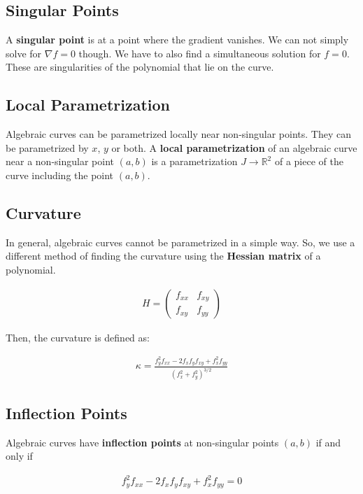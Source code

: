 \documentclass[11pt]{article}
\begin{document}
\subsection{Singular Points}
\label{sec:org06f9d47}
A \textbf{singular point} is at a point where the gradient vanishes. We can not simply solve for \(\nabla f = 0\) though. We have to also find a simultaneous solution for \(f = 0\). These are singularities of the polynomial that lie on the curve.
\subsection{Local Parametrization}
\label{sec:org8443ee6}
Algebraic curves can be parametrized locally near non-singular points. They can be parametrized by \(x\), \(y\) or both. A \textbf{local parametrization} of an algebraic curve near a non-singular point \(\left( a,b \right)\) is a parametrization \(J \rightarrow \mathbb{R}^{2}\) of a piece of the curve including the point \(\left( a,b \right)\).

\subsection{Curvature}
\label{sec:orgdcc2a2f}
In general, algebraic curves cannot be parametrized in a simple way. So, we use a different method of finding the curvature using the \textbf{Hessian matrix} of a polynomial.

\begin{align*}
    H = \begin{pmatrix} f_{xx} & f_{xy} \\ f_{xy} & f_{yy} \end{pmatrix}
\end{align*}

Then, the curvature is defined as:

\begin{align*}
    \kappa = \frac{f_{y}^{2}f_{xx}-2f_{x}f_{y}f_{xy}+f_{x}^{2}f_{yy}}{\left(f_{x}^{2} + f_{y}^{2}\right)^{3/2}}
\end{align*}

\subsection{Inflection Points}
\label{sec:org1eb68cb}
Algebraic curves have \textbf{inflection points} at non-singular points \(\left(a,b\right)\) if and only if

\begin{align*}
    f_{y}^{2}f_{xx}-2f_{x}f_{y}f_{xy}+f_{x}^{2}f_{yy} = 0
\end{align*}
\end{document}
